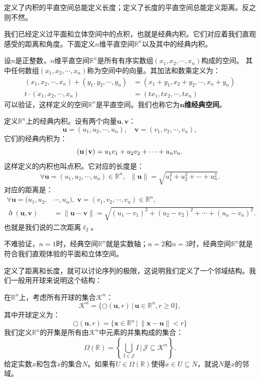 \documentclass[12pt,UTF8]{ctexbook}
\begin{document}
\begin{appendix}
定义了内积的平直空间总能定义长度；定义了长度的平直空间总能定义距离。反之则不然。

我们已经定义过平面和立体空间中的点积，也就是经典内积。它们对应着我们直观感受的距离和角度。下面定义$n$维平直空间$\mathbb{R}^n$以及其中的经典内积。
\begin{df}
    设$n$是正整数，$n$维平直空间$\mathbb{R}^n$是所有有序实数组$(x_1, x_2, \cdots, x_n)$构成的空间。
    其中任何数组$(x_1, x_2, \cdots, x_n)$称为空间中的向量。其加法和数乘定义为：
    \begin{align*}
        (x_1, x_2, \cdots, x_n) + (y_1, y_2, \cdots, y_n) &= (x_1 + y_1, x_2 + y_2, \cdots, x_n + y_n) \\
        t\cdot (x_1, x_2, \cdots, x_n) &= (tx_1, tx_2, \cdots, t x_n)
    \end{align*}
    可以验证，这样定义的空间$\mathbb{R}^n$是平直空间。我们也称它为$\boldsymbol{n}$\textbf{维经典空间}。

    定义$\mathbb{R}^n$上的经典内积。设有两个向量$\mathbf{u}, \mathbf{v}$：
    $$ \mathbf{u} = (u_1, u_2, \cdots, u_n), \quad  \mathbf{v} = (v_1, v_2, \cdots, v_n), $$
    它们的经典内积为：
    $$ \displaystyle\left( \mathbf{u} \,|\, \mathbf{v} \right) = u_1v_1 + u_2v_2 + \cdots + u_n v_n.$$
    这样定义的内积也叫点积。它对应的长度是：
    $$ \forall \mathbf{u} = (u_1, u_2, \cdots, u_n) \in \mathbb{R}^n, \;\; \| \mathbf{u}\| = \sqrt{u_1^2 + u_2^2 + \cdots + u_n^2} .$$
    对应的距离是：
    \begin{align*}
        \forall \mathbf{u} = (u_1, u_2, &\cdots, u_n), \; \mathbf{v} = (v_1, v_2, \cdots, v_n) \in \mathbb{R}^n, \\
        \eth(\mathbf{u}, \mathbf{v}) &= \| \mathbf{u} - \mathbf{v}\| = \sqrt{(u_1 - v_1)^2 + (u_2 - v_2)^2 + \cdots + (u_n - v_n)^2} .
    \end{align*}
    也就是我们说的二次距离$\ell_2$。
\end{df}
不难验证，$n=1$时，经典空间$\mathbb{R}^n$就是实数轴；$n=2$和$n=3$时，经典空间$\mathbb{R}^n$就是符合我们直观体验的平面和立体空间。

定义了距离和长度，就可以讨论序列的极限，这说明我们定义了一个邻域结构。我们一般用开球来说明这个结构：
\begin{df}
    在$\mathbb{R}^n$上，考虑所有开球的集合$\mathcal{K}^n$：
    $$ \mathcal{K}^n = \{ \bigcirc(\mathbf{u}, r) \, | \, \mathbf{u} \in \mathbb{R}^n, r \geqslant 0 \},$$
    其中开球定义为：
    $$ \bigcirc(\mathbf{u},r) = \{ \mathbf{x}\in \mathbb{R}^n\,|\, \| \mathbf{x} - \mathbf{u}\| < r\} $$
    我们定义$\mathbb{R}^n$的开集是所有由$\mathcal{K}^n$中元素的并集构成的集合：
    $$ \Omega(\mathbb{R}) = \left\{\bigcup_{I \in \mathcal{J}} I \, \Bigg| \,\mathcal{J} \subseteq  \mathcal{K}^n \right\}.$$
    给定实数$x$和包含$x$的集合$N$。如果有$U\in\Omega(\mathbb{R})$使得$x\in U\subseteq N$，就说$N$是$x$的邻域。


\end{df}
\end{appendix}
\end{document}
